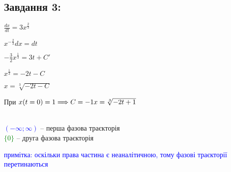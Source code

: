 \subsection{Завдання 3:}

\begin{minipage}{0.49\textwidth}
    $\frac{dx}{dt} = 3x^{\frac{2}{3}}$

    $x^{-\frac{2}{3}}dx = dt$

    $-\frac{3}{2}x^{\frac{1}{3}} = 3t + C'$

    $x^{\frac{1}{3}} = -2t - C$

    $x = \sqrt[3]{-2t - C}$

    При $x(t = 0) = 1 \Longrightarrow C = -1\\
    x = \sqrt[3]{-2t + 1}$

\end{minipage}
\begin{minipage}{0.49\textwidth}
    \centering \resizebox*{7cm}{7cm}{}\\
    \textcolor{blue}{$(-\infty;\infty)$} -- перша фазова траєкторія\\
    \textcolor{green}{$\{0\}$} -- друга фазова траєкторія
\end{minipage}

\textcolor{blue}{примітка: оскільки права частина є неаналітичною, тому фазові траєкторії перетинаються}